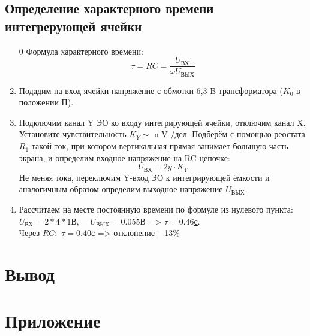 \documentclass[14pt,a4paper]{article}
\begin{document}
\subsection*{Определение характерного времени интегрерующей ячейки}\begin{enumerate}
  \item[0] Формула характерного времени:
  $$\tau = RC = \frac{U_\text{ВХ}}{\omega U_\text{ВЫХ}}$$
  \item Подадим на вход ячейки
  напряжение с обмотки 6,3 B трансформатора ($K_0$ в положении П).
  \item Подключим канал Y ЭО ко входу интегрирующей ячейки, отключим канал X. Установите чувствительность $K_Y \sim$ n V /дел. Подберём с помощью реостата $R_1$ такой ток, при котором вертикальная прямая занимает
  большую часть экрана, и определим входное напряжение на RC-цепочке:
  $$U_\text{ВХ} = 2y \cdot K_Y$$
  Не меняя тока, переключим Y-вход ЭО к интегрирующей ёмкости и
  аналогичным образом определим выходное напряжение $U_\text{ВЫХ}$.
  \item  Рассчитаем на месте постоянную времени по формуле из нулевого пункта:\\
  $U_\text{ВХ} = 2 * 4 * 1$В, \ \  $U_\text{ВЫХ} = 0.055$В => \underline{$\tau = 0.46$с}.\\
  Через $RC:$ $\tau = 0.40$с => отклонение -- 13\%
\end{enumerate}

\section*{Вывод}

\newpage
\section*{Приложение}
\end{document}
